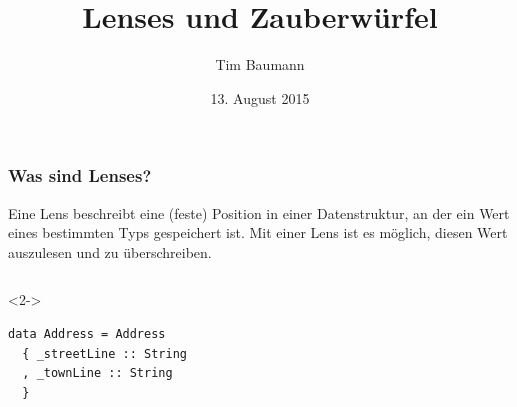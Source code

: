 \documentclass{beamer}
\title[Lens]{Lenses und Zauberwürfel}
\author{Tim Baumann}
\institute[CCA]{Curry Club Augsburg}
\date{13. August 2015}
\begin{document}
\begin{frame}
  \titlepage
\end{frame}

\begin{frame}[t,fragile]
  \frametitle{Was sind Lenses?}
  Eine Lens beschreibt eine (feste) Position in einer Datenstruktur, an der ein Wert eines bestimmten Typs gespeichert ist.
  Mit einer Lens ist es möglich, diesen Wert auszulesen und zu überschreiben.
  \begin{columns}[t]
    \begin{visibleenv}<2->
\begin{verbatim}
data Address = Address
  { _streetLine :: String
  , _townLine :: String
  }


\end{verbatim}
\end{visibleenv}
\end{columns}
\end{frame}
\end{document}
